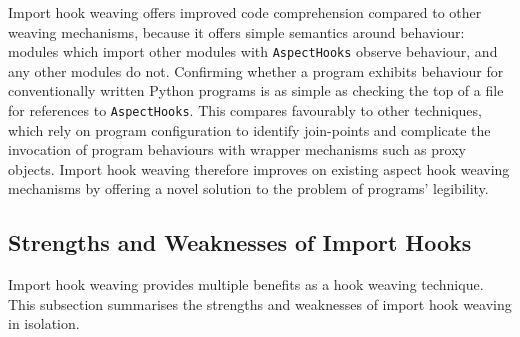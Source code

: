 Import hook weaving offers improved code comprehension compared to other weaving
mechanisms, because it offers simple semantics around \aspectoriented behaviour:
modules which import other modules with \lstinline{AspectHooks} observe
\aspectoriented behaviour, and any other modules do not. Confirming whether a
program exhibits \aspectoriented behaviour for conventionally written Python
programs is as simple as checking the top of a file for references to
\lstinline{AspectHooks}. This compares favourably to other techniques, which
rely on program configuration to identify join-points and complicate the
invocation of \aspectoriented program behaviours with wrapper mechanisms such as
proxy objects. Import hook weaving therefore improves on existing aspect hook
weaving mechanisms by offering a novel solution to the problem of
\aspectoriented programs' legibility.







\subsection{Strengths and Weaknesses of Import Hooks}\label{subsec:pdsf3importhooklimitations}

Import hook weaving provides multiple benefits as a hook weaving technique. This
subsection summarises the strengths and weaknesses of import hook weaving in
isolation.


